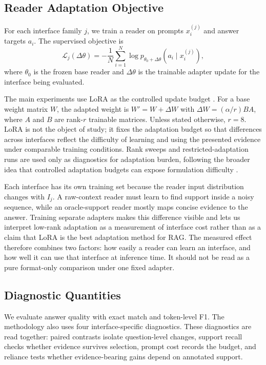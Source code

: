 \documentclass[a4paper,fleqn]{cas-sc}
\begin{document}
\subsection{Reader Adaptation Objective}

For each interface family $j$, we train a reader on prompts
$x_i^{(j)}$ and answer targets $a_i$. The supervised objective is
\begin{equation}
\mathcal{L}_j(\Delta\theta)
= -\frac{1}{N}\sum_{i=1}^{N}
\log p_{\theta_0+\Delta\theta}(a_i \mid x_i^{(j)}),
\label{eq:reader-loss}
\end{equation}
where $\theta_0$ is the frozen base reader and $\Delta\theta$ is the trainable
adapter update for the interface being evaluated.

The main experiments use LoRA as the controlled update budget
\citep{hu2022lora}. For a base weight matrix $W$, the adapted weight is
$W'=W+\Delta W$ with
$\Delta W=(\alpha/r)BA$, where $A$ and $B$ are rank-$r$ trainable matrices.
Unless stated otherwise, $r=8$. LoRA is not the object of study; it fixes the
adaptation budget so that differences across interfaces reflect the difficulty
of learning and using the presented evidence under comparable training
conditions. Rank sweeps and restricted-adaptation runs are used only as
diagnostics for adaptation burden, following the broader idea that controlled
adaptation budgets can expose formulation difficulty
\citep{prasad2026reasoningchains,aghajanyan2021intrinsic}.

Each interface has its own training set because the reader input distribution
changes with $I_j$. A raw-context reader must learn to find support inside a
noisy sequence, while an oracle-support reader mostly maps concise evidence to
the answer. Training separate adapters makes this difference visible and lets
us interpret low-rank adaptation as a measurement of interface cost rather than
as a claim that LoRA is the best adaptation method for RAG. The measured effect
therefore combines two factors: how easily a reader can learn an interface, and
how well it can use that interface at inference time. It should not be read as
a pure format-only comparison under one fixed adapter.

\subsection{Diagnostic Quantities}

We evaluate answer quality with exact match and token-level F1. The methodology
also uses four interface-specific diagnostics. These diagnostics are read
together: paired contrasts isolate question-level changes, support recall checks
whether evidence survives selection, prompt cost records the budget, and
reliance tests whether evidence-bearing gains depend on annotated support.
\end{document}
